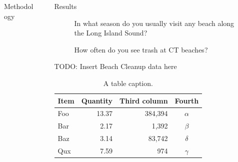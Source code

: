 \documentclass[final]{beamer}
\newlength{\sepwidth}
\newlength{\colwidth}
\newcommand{\separatorcolumn}{\begin{column}{\sepwidth}\end{column}}
\begin{document}
\begin{frame}[t]
\begin{columns}[t]
\begin{column}{\colwidth}
\begin{block}{Methodology}
        \end{block}
      \end{column}

      \separatorcolumn

      \begin{column}{\colwidth}

        \begin{block}{Results}

          \begin{figure}[1]
            \centering
            \caption{In what season do you usually visit any beach along the Long Island Sound?}
        \end{figure}
        
        \begin{figure}[2]
            \centering
            \caption{How often do you see trash at CT beaches?}
        \end{figure}

          
          TODO: Insert Beach Cleanup data here
          \begin{table}
            \centering
            \begin{tabular}{l r r c}
              \toprule
              \textbf{Item} & \textbf{Quantity} & \textbf{Third column} & \textbf{Fourth} \\
              \midrule
              Foo & 13.37 & 384,394 & $\alpha$ \\
              Bar & 2.17 & 1,392 & $\beta$ \\
              Baz & 3.14 & 83,742 & $\delta$ \\
              Qux & 7.59 & 974 & $\gamma$ \\
              \bottomrule
            \end{tabular}
            \caption{A table caption.}
          \end{table}


\end{block}
\end{column}
\end{columns}
\end{frame}
\end{document}
